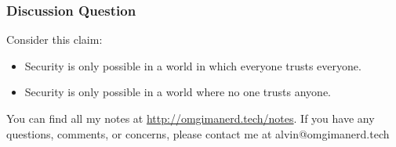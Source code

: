 \documentclass{math}
\begin{document}
\subsubsection*{Discussion Question}
Consider this claim:
\begin{itemize}
  \item Security is only possible in a world in which everyone trusts everyone.
  \item Security is only possible in a world where no one trusts anyone.
\end{itemize}

\begin{center}
  You can find all my notes at \url{http://omgimanerd.tech/notes}. If you have
  any questions, comments, or concerns, please contact me at
  alvin@omgimanerd.tech
\end{center}
\end{document}
